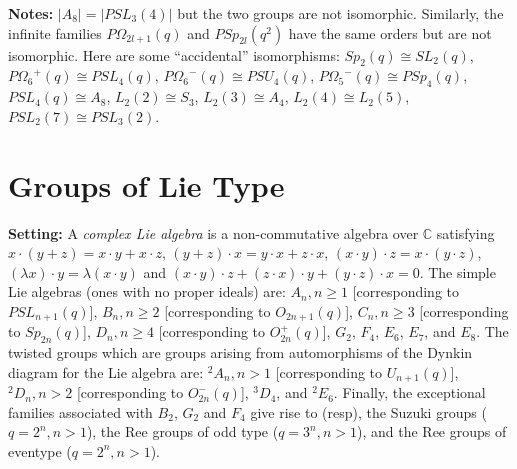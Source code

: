 {\bf Notes:} $|A_8|=|PSL_3(4)|$ but the two groups are not isomorphic.  Similarly, the infinite
families $P \Omega_{2l+1}(q)$ and $PSp_{2l}(q^2)$ have the same orders but are not isomorphic.
Here are some ``accidental'' isomorphisms:
$Sp_2(q) \cong SL_2(q)$,
$P{\Omega_6}^+(q) \cong PSL_4(q)$,
$P{\Omega_6}^-(q) \cong PSU_4(q)$,
$P{\Omega_5}^-(q) \cong PSp_4(q)$,
$PSL_4(q) \cong A_8$,
$L_2(2) \cong S_3$,
$L_2(3) \cong A_4$,
$L_2(4) \cong L_2(5)$,
$PSL_2(7) \cong PSL_3(2)$.
\section{Groups of Lie Type}
{\bf Setting:}
A \emph{complex Lie algebra} is a non-commutative algebra over ${\mathbb C}$ satisfying
$x \cdot (y+z)= x \cdot y + x \cdot z$,
$(y+z) \cdot x =  y \cdot x + z \cdot x$, $(x \cdot y) \cdot z = x \cdot (y \cdot z)$,
$(\lambda x) \cdot y = \lambda (x \cdot y)$ and
$ (x \cdot y) \cdot z + (z \cdot x) \cdot y + (y \cdot z) \cdot x = 0$.
The simple Lie algebras (ones with no proper ideals) are:
$A_n, n \ge 1$ [corresponding to $PSL_{n+1}(q)$],
$B_n, n \ge 2$ [corresponding to $O_{2n+1}(q)$],
$C_n, n \ge 3$ [corresponding to $Sp_{2n}(q)$],
$D_n, n \ge 4$ [corresponding to $O^+_{2n}(q)$],
$G_2$,
$F_4$,
$E_6$,
$E_7$, and
$E_8$.  The twisted groups which are groups arising from automorphisms of the Dynkin
diagram for the Lie algebra are:
$^2A_n, n > 1$ [corresponding to $U_{n+1}(q)$],
$^2D_n, n > 2$ [corresponding to $O^-_{2n}(q)$],
$^3D_4$, and $^2E_6$.  Finally, the exceptional families associated with
$B_2$, $G_2$ and $F_4$ give rise to (resp), 
the Suzuki groups ($q=2^n, n > 1$),
the Ree groups of odd type ($q=3^n, n > 1$), and
the Ree groups of eventype ($q=2^n, n > 1$).

